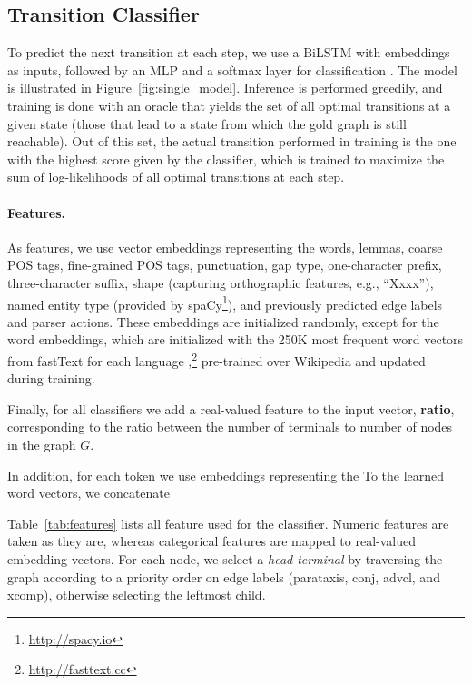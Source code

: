 \documentclass[11pt,a4paper]{article}
\begin{document}
\subsection{Transition Classifier}\label{sec:classifier}

To predict the next transition at each step,
we use a BiLSTM with embeddings as inputs,
followed by an MLP and a softmax layer for classification \cite{kiperwasser2016simple}.
The model is illustrated in Figure~\ref{fig:single_model}.
Inference is performed greedily,
and training is done with an oracle that yields the set of all optimal 
transitions at a given state (those that lead to a state from which the gold graph is still reachable).
Out of this set, the actual transition performed in training is the one
with the highest score given by the classifier,
which is trained to maximize the sum of log-likelihoods of all 
optimal transitions at each step.




\paragraph{Features.}

As features, we use vector embeddings
representing the words, lemmas, coarse POS tags, fine-grained POS tags,
punctuation, gap type, one-character prefix, three-character suffix,
shape (capturing orthographic features, e.g., ``Xxxx''), named entity type
(provided by spaCy\footnote{\url{http://spacy.io}}),
and previously predicted edge labels and parser actions.
These embeddings are initialized randomly, except for the word embeddings,
which are initialized with the 250K most frequent word vectors from fastText
for each language
\cite{bojanowski2016enriching},\footnote{\url{http://fasttext.cc}}
pre-trained over Wikipedia and updated during training.

Finally, for all classifiers we add a real-valued feature to the input vector,
\textbf{ratio}, corresponding to the ratio between the number of terminals to number of nodes
in the graph $G$.


In addition, for each token
we use embeddings representing the 
To the learned word vectors, we concatenate 

Table~\ref{tab:features} lists all feature used for the classifier.
Numeric features are taken as they are, whereas categorical features are mapped to real-valued embedding
vectors.
For each node, we select a \textit{head terminal} by traversing the graph according to
a priority order on edge labels (\textrm{parataxis}, \textrm{conj},
\textrm{advcl}, and \textrm{xcomp}),
otherwise selecting the leftmost child.
\end{document}
